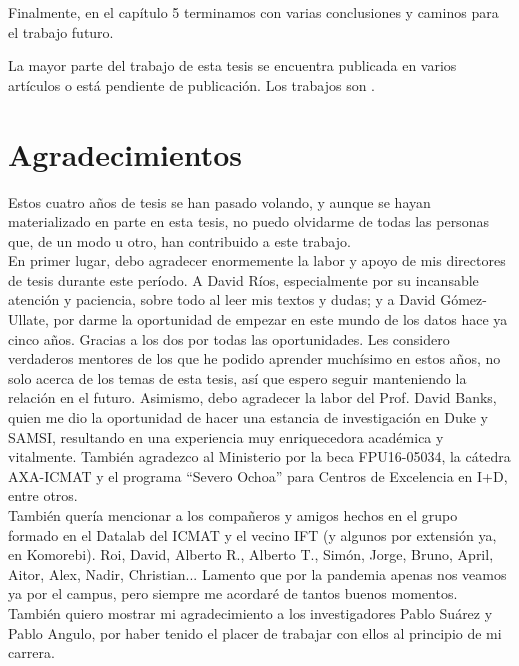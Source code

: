 \documentclass[a4paper, 11pt, openright, twoside]{reportPhD}
\numberwithin{figure}{chapter}
\numberwithin{table}{chapter}
\numberwithin{equation}{chapter}
\begin{document}
Finalmente, en el capítulo 5 terminamos con varias conclusiones y caminos para el trabajo futuro.

La mayor parte del trabajo de esta tesis se encuentra publicada en varios artículos o está pendiente de publicación. Los trabajos son  \parencite{gallego2019dlms,angulo2018bayesian,gallego2019reinforcement,gallego2019opponent,gallego2021data,gallego2019vis,gallego2018stochastic,AMLARA,math8111957,gallego2020protecting}.


\chapter*{Agradecimientos}

Estos cuatro años de tesis se han pasado volando, y aunque se hayan materializado en parte en esta tesis, no puedo olvidarme de todas las personas que, de un modo u otro, han contribuido a este trabajo. \\

En primer lugar, debo agradecer enormemente la labor y apoyo de mis directores de tesis durante este período. A David Ríos, especialmente por su incansable atención y paciencia, sobre todo al leer mis textos y dudas; y a David Gómez-Ullate, por darme la oportunidad de empezar en este mundo de los datos hace ya cinco años. Gracias a los dos por todas las oportunidades. Les considero verdaderos mentores de los que he podido aprender muchísimo en estos años, no solo acerca de los temas de esta tesis, así que espero seguir manteniendo la relación en el futuro. 
Asimismo, debo agradecer la labor del Prof. David Banks, quien me dio la oportunidad de hacer una estancia de investigación en Duke y SAMSI, resultando en una experiencia muy enriquecedora académica y vitalmente. También agradezco al Ministerio por la beca FPU16-05034, la cátedra AXA-ICMAT y el programa “Severo Ochoa”
para Centros de Excelencia en I+D, entre otros. \\

También quería mencionar a los compañeros y amigos hechos en el grupo formado en el Datalab del ICMAT y el vecino IFT (y algunos por extensión ya, en Komorebi). Roi, David, Alberto R., Alberto T., Simón, Jorge, Bruno, April, Aitor, Alex, Nadir, Christian... 
Lamento que por la pandemia apenas nos veamos ya por el campus, pero siempre me acordaré de tantos buenos momentos. También quiero mostrar mi agradecimiento a los investigadores Pablo Suárez y Pablo Angulo, por haber tenido el placer de trabajar con ellos al principio de mi carrera.  \\
\end{document}
